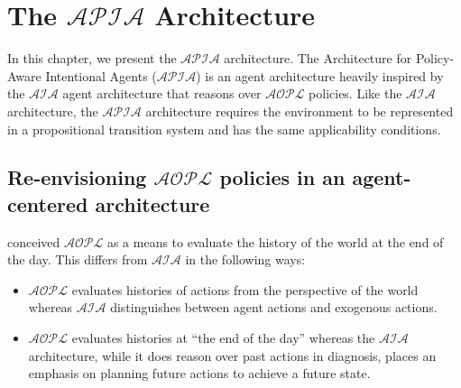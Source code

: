 \chapter{The $\mathcal{APIA}$ Architecture}

%
%
%
%
%
%

In this chapter, we present the $\mathcal{APIA}$ architecture.
The Architecture for Policy-Aware Intentional Agents ($\mathcal{APIA}$) is an agent architecture heavily inspired by the $\mathcal{AIA}$ agent architecture that reasons over $\mathcal{AOPL}$ policies.
Like the $\mathcal{AIA}$ architecture, the $\mathcal{APIA}$ architecture requires the environment to be represented in a propositional transition system and has the same applicability conditions.

\section{Re-envisioning $\mathcal{AOPL}$ policies in an agent-centered architecture}

 conceived $\mathcal{AOPL}$ as a means to evaluate the history of the world at the end of the day.
This differs from $\mathcal{AIA}$ in the following ways:

\begin{itemize}
    \item $\mathcal{AOPL}$ evaluates histories of actions from the perspective of the world whereas $\mathcal{AIA}$ distinguishes between agent actions and exogenous actions.
    \item $\mathcal{AOPL}$ evaluates histories at ``the end of the day'' whereas the $\mathcal{AIA}$ architecture, while it does reason over past actions in diagnosis, places an emphasis on planning future actions to achieve a future state.
\end{itemize}

